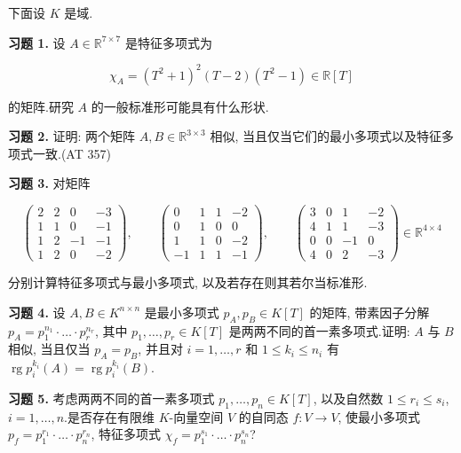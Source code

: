 \aufgaben

下面设 $K$ 是域.

\noindent\textbf{习题 1.} 设 $A \in \mathbb{R}^{7 \times 7}$ 是特征多项式为

\[
\chi_A = (T^2 + 1)^2 (T - 2)(T^2 - 1) \in \mathbb{R}[T]\]

的矩阵.研究 $A$ 的一般标准形可能具有什么形状.

\medskip
\noindent\textbf{习题 2.} 证明: 两个矩阵 $A, B \in \mathbb{R}^{3 \times 3}$ 相似, 当且仅当它们的最小多项式以及特征多项式一致.(AT 357)

\medskip
\noindent\textbf{习题 3.} 对矩阵

\[
\left(\begin{array}{cccc} 2 & 2 & 0 & -3 \\ 1 & 1 & 0 & -1 \\ 1 & 2 & -1 & -1 \\ 1 & 2 & 0 & -2 \end{array}\right), \qquad \left(\begin{array}{cccc} 0 & 1 & 1 & -2 \\ 0 & 1 & 0 & 0 \\ 1 & 1 & 0 & -2 \\ -1 & 1 & 1 & -1 \end{array}\right), \qquad \left(\begin{array}{cccc} 3 & 0 & 1 & -2 \\ 4 & 1 & 1 & -3 \\ 0 & 0 & -1 & 0 \\ 4 & 0 & 2 & -3 \end{array}\right) \in \mathbb{R}^{4 \times 4}\]

分别计算特征多项式与最小多项式, 以及若存在则其若尔当标准形.

\medskip
\noindent\textbf{习题 4.} 设 $A, B \in K^{n \times n}$ 是最小多项式 $p_A, p_B \in K[T]$ 的矩阵, 带素因子分解 $p_A = p_1^{n_1} \cdot \ldots \cdot p_r^{n_r}$, 其中 $p_1, \ldots, p_r \in K[T]$ 是两两不同的首一素多项式.证明: $A$ 与 $B$ 相似, 当且仅当 $p_A = p_B$, 并且对 $i = 1, \ldots, r$ 和 $1 \leq k_i \leq n_i$ 有 $\operatorname{rg} p_i^{k_i}(A) = \operatorname{rg} p_i^{k_i}(B)$.

\medskip
\noindent\textbf{习题 5.} 考虑两两不同的首一素多项式 $p_1, \ldots, p_n \in K[T]$, 以及自然数 $1 \leq r_i \leq s_i$, $i = 1, \ldots, n$.是否存在有限维 $K$-向量空间 $V$ 的自同态 $f \colon V \longrightarrow V$, 使最小多项式 $p_f = p_1^{r_1} \cdot \ldots \cdot p_n^{r_n}$, 特征多项式 $\chi_f = p_1^{s_1} \cdot \ldots \cdot p_n^{s_n}$?

